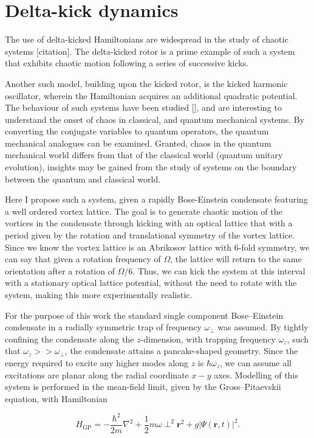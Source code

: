\section{Delta-kick dynamics}
The use of delta-kicked Hamiltonians are widespread in the study of chaotic systems [citation]. The delta-kicked rotor is a prime example of such a system that exhibits chaotic motion following a series of successive kicks.

Another such model, building upon the kicked rotor, is the kicked harmonic oscillator, wherein the Hamiltonian acquires an additional quadratic potential. The behaviour of such systems have been studied [], and are interesting to understand the onset of chaos in classical, and quantum mechanical systems. By converting the conjugate variables to quantum operators, the quantum mechanical analogues can be examined. Granted, chaos in the quantum mechanical world differs from that of the classical world (quantum unitary evolution), insights may be gained from the study of systems on the boundary between the quantum and classical world.

Here I propose such a system, given a rapidly Bose-Einstein condensate featuring a well ordered vortex lattice. The goal is to generate chaotic motion of the vortices in the condensate through kicking with an optical lattice that with a period given by the rotation and translational symmetry of the vortex lattice. Since we know the vortex lattice is an Abrikosov lattice with 6-fold symmetry, we can say that given a rotation frequency of $\Omega$, the lattice will return to the same orientation after a rotation of $\Omega/6$. Thus, we can kick the system at this interval with a stationary optical lattice potential, without the need to rotate with the system, making this more experimentally realistic.


For the purpose of this work the standard single component Bose--Einstein condensate in a radially symmetric trap of frequency $\omega_\perp$ was assumed. By tightly confining the condensate along the $z$-dimension, with trapping frequency $\omega_z$, such that $\omega_z >> \omega_\perp$, the condensate attains a pancake-shaped geometry. Since the energy required to excite any higher modes along $z$ is $\hbar\omega_z$, we can assume all excitations are planar along the radial coordinate $x-y$ axes. Modelling of this system is performed in the  mean-field limit, given by the Gross--Pitaevskii equation, with Hamiltonian

\begin{equation}\label{eqn:gpe_h0}
	H_{\mathrm{GP}} = -\frac{\hbar^2}{2m}\nabla^2 + \frac{1}{2}m\omega\perp^2\mathbf{r}^2 + g\vert\Psi(\mathbf{r},t)\vert^2.
\end{equation}

